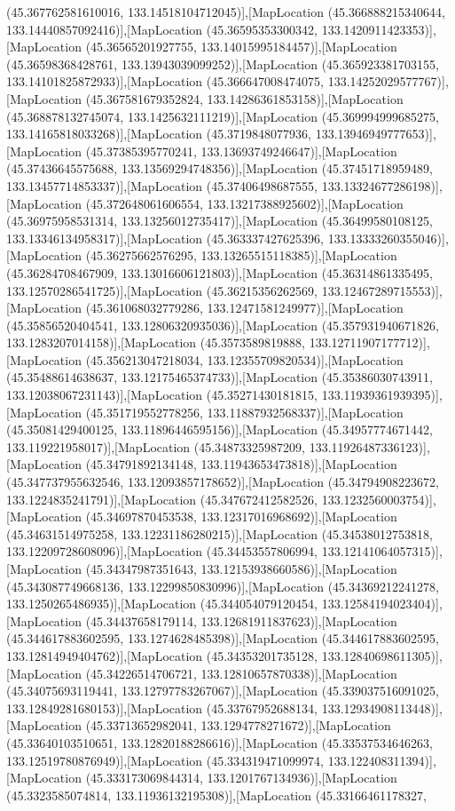 (45.367762581610016, 133.14518104712045)],[MapLocation (45.366888215340644, 133.14440857092416)],[MapLocation (45.36595353300342, 133.1420911423353)],[MapLocation (45.36565201927755, 133.14015995184457)],[MapLocation (45.36598368428761, 133.13943039099252)],[MapLocation (45.365923381703155, 133.14101825872933)],[MapLocation (45.366647008474075, 133.14252029577767)],[MapLocation (45.367581679352824, 133.14286361853158)],[MapLocation (45.368878132745074, 133.1425632111219)],[MapLocation (45.369994999685275, 133.14165818033268)],[MapLocation (45.3719848077936, 133.13946949777653)],[MapLocation (45.37385395770241, 133.13693749246647)],[MapLocation (45.37436645575688, 133.13569294748356)],[MapLocation (45.37451718959489, 133.13457714853337)],[MapLocation (45.37406498687555, 133.13324677286198)],[MapLocation (45.372648061606554, 133.13217388925602)],[MapLocation (45.36975958531314, 133.13256012735417)],[MapLocation (45.36499580108125, 133.13346134958317)],[MapLocation (45.363337427625396, 133.13333260355046)],[MapLocation (45.36275662576295, 133.13265515118385)],[MapLocation (45.36284708467909, 133.13016606121803)],[MapLocation (45.36314861335495, 133.12570286541725)],[MapLocation (45.36215356262569, 133.12467289715553)],[MapLocation (45.361068032779286, 133.12471581249977)],[MapLocation (45.35856520404541, 133.12806320935036)],[MapLocation (45.357931940671826, 133.1283207014158)],[MapLocation (45.3573589819888, 133.12711907177712)],[MapLocation (45.356213047218034, 133.12355709820534)],[MapLocation (45.35488614638637, 133.12175465374733)],[MapLocation (45.35386030743911, 133.12038067231143)],[MapLocation (45.35271430181815, 133.11939361939395)],[MapLocation (45.351719552778256, 133.11887932568337)],[MapLocation (45.35081429400125, 133.11896446595156)],[MapLocation (45.34957774671442, 133.119221958017)],[MapLocation (45.34873325987209, 133.11926487336123)],[MapLocation (45.34791892134148, 133.11943653473818)],[MapLocation (45.347737955632546, 133.12093857178652)],[MapLocation (45.34794908223672, 133.1224835241791)],[MapLocation (45.347672412582526, 133.1232560003754)],[MapLocation (45.34697870453538, 133.12317016968692)],[MapLocation (45.34631514975258, 133.12231186280215)],[MapLocation (45.34538012753818, 133.12209728608096)],[MapLocation (45.34453557806994, 133.12141064057315)],[MapLocation (45.34347987351643, 133.12153938660586)],[MapLocation (45.343087749668136, 133.12299850830996)],[MapLocation (45.34369212241278, 133.1250265486935)],[MapLocation (45.344054079120454, 133.12584194023404)],[MapLocation (45.34437658179114, 133.12681911837623)],[MapLocation (45.344617883602595, 133.1274628485398)],[MapLocation (45.344617883602595, 133.12814949404762)],[MapLocation (45.34353201735128, 133.12840698611305)],[MapLocation (45.34226514706721, 133.12810657870338)],[MapLocation (45.34075693119441, 133.12797783267067)],[MapLocation (45.339037516091025, 133.12849281680153)],[MapLocation (45.33767952688134, 133.12934908113448)],[MapLocation (45.33713652982041, 133.1294778271672)],[MapLocation (45.33640103510651, 133.12820188286616)],[MapLocation (45.33537534646263, 133.12519780876949)],[MapLocation (45.334319471099974, 133.122408311394)],[MapLocation (45.333173069844314, 133.1201767134936)],[MapLocation (45.3323585074814, 133.11936132195308)],[MapLocation (45.33166461178327, 